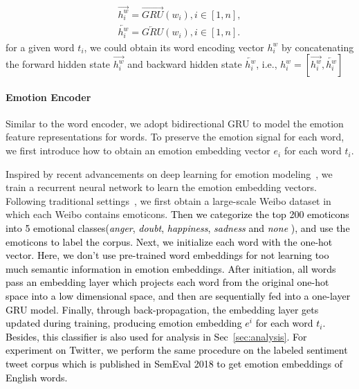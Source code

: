 \documentclass[conference]{IEEEtran}
\newcommand{\new}[1]{\textcolor{black}{{#1}}}
\begin{document}
	\begin{equation}
	\begin{aligned}
	\overrightarrow{h_i^w} = \overrightarrow{GRU}(w_i), i \in [1, n],\\
	\overleftarrow{h_i^w} = \overleftarrow{GRU}(w_i), i\in [1, n].
	\end{aligned}
	\end{equation}%
	for a given word $t_i$, we could obtain its word encoding vector $h_i^w$ by concatenating the forward hidden state $\overrightarrow{h_i^w}$ and backward hidden state $\overleftarrow{h_i^w}$, i.e., $h_i^w=[\overrightarrow{h_i^w}, \overleftarrow{h_i^w}]$
	
	\paragraph{Emotion Encoder}\label{sec:classifier}
	Similar to the word encoder, we adopt bidirectional GRU to model the emotion feature representations for words. To preserve the emotion signal for each word, we first introduce how to obtain an emotion embedding vector $e_i$ for each word $t_i$.
	
	Inspired by recent advancements on deep learning for emotion modeling~\cite{agrawal2018learning}, we train a recurrent neural network to learn the emotion embedding vectors. Following traditional settings~\cite{hu2013unsupervised}, we first obtain a large-scale Weibo dataset in which each Weibo contains emoticons. \new{Then we categorize the top 200 emoticons into 5 emotional classes(\textit{anger}, \textit{doubt}, \textit{happiness}, \textit{sadness} and \textit{none} ), and use the emoticons to label the corpus. Next, we initialize each word with the one-hot vector. Here, we don't use pre-trained word embeddings for not learning too much semantic information in emotion embeddings. After initiation, all words pass an embedding layer which projects each word from the original one-hot space into a low dimensional space, and then are sequentially fed into a one-layer GRU model. Finally, through back-propagation, the embedding layer gets updated during training, producing emotion embedding $e^i$  for each word $t_i$. Besides, this classifier is also used for analysis in Sec~\ref{sec:analysis}. For experiment on Twitter, we perform the same procedure on the labeled sentiment tweet corpus which is published in SemEval 2018\cite{SemEval2018Task1} to get emotion embeddings of English words.}
	
\end{document}
